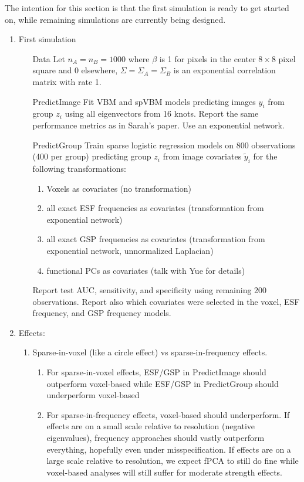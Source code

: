 \documentclass[12pt]{article}
\begin{document}
The intention for this section is that the first simulation is ready to get started on, while remaining simulations are currently being designed.

\begin{enumerate}
	\item First simulation
	      \begin{enumerate}
		      \item[Data] Let $n_A=n_B=1000$ where $\beta$ is 1 for pixels in the center $8\times8$ pixel square and 0 elsewhere, $\Sigma=\Sigma_A=\Sigma_B$ is an exponential correlation matrix with rate 1.
		      \item[PredictImage] Fit VBM and spVBM models predicting images $y_i$ from group $z_i$ using all eigenvectors from 16 knots. Report the same performance metrics as in Sarah's paper. Use an exponential network.
		      \item[PredictGroup] Train sparse logistic regression models on 800 observations (400 per group) predicting group $z_i$ from image covariates $\tilde y_i$ for the following transformations:
			      \begin{enumerate}
				      \item Voxels as covariates (no transformation)
				      \item all exact ESF frequencies as covariates (transformation from exponential network)
				      \item all exact GSP frequencies as covariates (transformation from exponential network, unnormalized Laplacian)
				      \item functional PCs as covariates (talk with Yue for details)
			      \end{enumerate}
			      Report test AUC, sensitivity, and specificity using remaining 200 observations. Report also which covariates were selected in the voxel, ESF frequency, and GSP frequency models.
	      \end{enumerate}
	\item Effects:
	      \begin{enumerate}
		      \item Sparse-in-voxel (like a circle effect) vs sparse-in-frequency effects.
		            \begin{enumerate}
			            \item For sparse-in-voxel effects, ESF/GSP in PredictImage should outperform voxel-based while ESF/GSP in PredictGroup should underperform voxel-based
			            \item For sparse-in-frequency effects, voxel-based should underperform. If effects are on a small scale relative to resolution (negative eigenvalues), frequency approaches should vastly outperform everything, hopefully even under misspecification. If effects are on a large scale relative to resolution, we expect fPCA to still do fine while voxel-based analyses will still suffer for moderate strength effects.

\end{enumerate}
\end{enumerate}
\end{enumerate}
\end{document}
